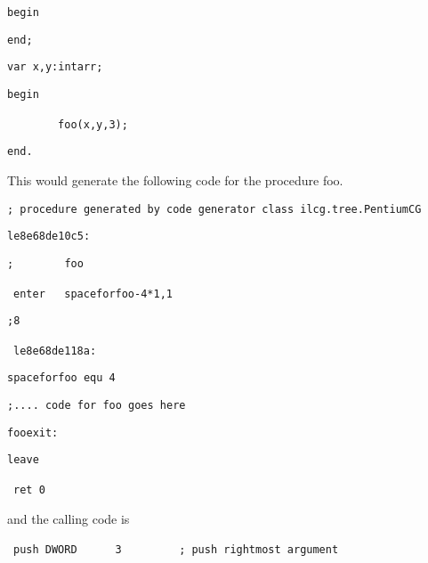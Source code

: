 {\begin{lyxcode}
\textrm{\texttt{\small begin}}{\small \par}

\textrm{\texttt{\small end;}}{\small \par}

\textrm{\texttt{\small var~x,y:intarr;}}{\small \par}

\textrm{\texttt{\small begin}}{\small \par}

~\textrm{\texttt{\small ~~~~~~~foo(x,y,3);}}{\small \par}

\textrm{\texttt{\small end.}}{\small \par}
\end{lyxcode}
This would generate the following code for the procedure foo.

\begin{lyxcode}
\texttt{\footnotesize ;~procedure~generated~by~code~generator~class~ilcg.tree.PentiumCG}{\footnotesize \par}

\texttt{\footnotesize le8e68de10c5:}{\footnotesize \par}

\texttt{\footnotesize ;~~~~~~~~foo}{\footnotesize \par}

~\texttt{\footnotesize enter~~~spaceforfoo-4{*}1,1}{\footnotesize \par}

\texttt{\footnotesize ;8}{\footnotesize \par}

~\texttt{\footnotesize le8e68de118a:}{\footnotesize \par}

\texttt{\footnotesize spaceforfoo~equ~4}{\footnotesize \par}

\texttt{\footnotesize ;....~code~for~foo~goes~here}{\footnotesize \par}

\texttt{\footnotesize fooexit:}{\footnotesize \par}

\texttt{\footnotesize leave}{\footnotesize \par}

~\texttt{\footnotesize ret~0}{\footnotesize \par}
\end{lyxcode}
and the calling code is

\begin{lyxcode}
~\texttt{\footnotesize push~DWORD~~~~~~3~~~~~~~~~;~push~rightmost~argument}{\footnotesize \par}


\end{lyxcode}}
